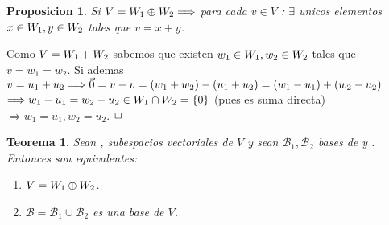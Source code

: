 \documentclass[]{article}
\newtheorem{theorem}{Teorema}
\newtheorem{proposition}{Proposicion}[theorem]
\newenvironment{proof}{\noindent{\bf Prueba:}}{$\hfill \Box$ \vspace{10pt}}
\newcommand{\ida}{\Longrightarrow}
\newcommand{\base}{\mathcal{B}}
\begin{document}
\begin{proposition}
    Si $V=\W{1} \oplus \W{2} \ida$ para cada $v\in V$ : $\exists$ unicos elementos $x \in \text{$W_{1}$} , y \in\text{$W_{2}$}$
    tales que $v=x+y$.
\end{proposition}
\begin{proof}
    Como $V=\text{$W_{1}$}+\text{$W_{2}$}$ sabemos que existen $w_1 \in \text{$W_{1}$}, w_2 \in \text{$W_{2}$}$ tales que $v=w_1=w_2$.
    Si ademas $v=u_1+u_2 \ida \cero= v-v= (w_1+w_2)-(u_1+u_2)=(w_1-u_1)+(w_2-u_2)$
    $\ida w_1-u_1 = w_2-u_2 \in \W{1}\cap\W{2}= \conjunto{0}$ (pues es suma directa) $\ida w_1=u_1 , w_2=u_2$.
\end{proof}

\begin{theorem}
    Sean , subespacios vectoriales de $V$ y sean $\base_1,\base_2$ bases de  y .\\
    Entonces son equivalentes:
    \begin{enumerate}
        \item $V=\text{$W_{1}$}\oplus\text{$W_{2}$}$.
        \item $\base = \base_1 \cup \base_2$ es una base de $V$.
    \end{enumerate}
\end{theorem}
\end{document}
